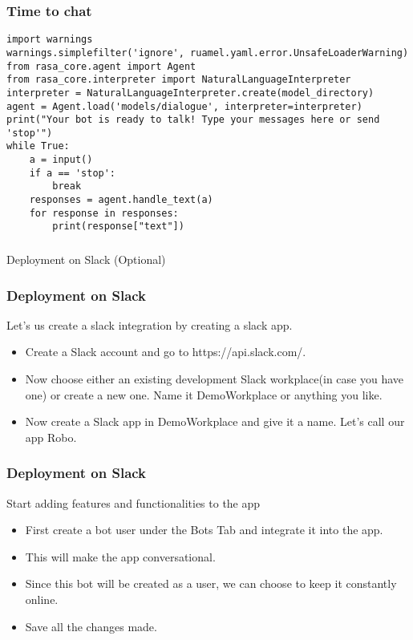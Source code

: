  \begin{frame}[fragile]\frametitle{ Time to chat}

\begin{lstlisting}
import warnings
warnings.simplefilter('ignore', ruamel.yaml.error.UnsafeLoaderWarning)
from rasa_core.agent import Agent
from rasa_core.interpreter import NaturalLanguageInterpreter
interpreter = NaturalLanguageInterpreter.create(model_directory)
agent = Agent.load('models/dialogue', interpreter=interpreter)
print("Your bot is ready to talk! Type your messages here or send 'stop'")
while True:
    a = input()
    if a == 'stop':
        break
    responses = agent.handle_text(a)
    for response in responses:
        print(response["text"])
\end{lstlisting}

\end{frame}

\begin{frame}[fragile]\frametitle{}
\begin{center}
{\Large Deployment on Slack (Optional)}

\end{center}
\end{frame}


 \begin{frame}[fragile]\frametitle{Deployment on Slack}
Let’s us create a slack integration by creating a slack app. 

\begin{itemize}
\item Create a Slack account and go to https://api.slack.com/. 
\item Now choose either an existing development Slack workplace(in case you have one) or create a new one. Name it DemoWorkplace or anything you like.
\item Now create a Slack app in DemoWorkplace and give it a name. Let’s call our app Robo.
\end{itemize}

\end{frame}

 \begin{frame}[fragile]\frametitle{Deployment on Slack}
Start adding features and functionalities to the app


\begin{itemize}
\item First create a bot user under the Bots Tab and integrate it into the app. 
\item This will make the app conversational. 
\item Since this bot will be created as a user, we can choose to keep it constantly online. 
\item Save all the changes made.
\end{itemize}

\end{frame}


